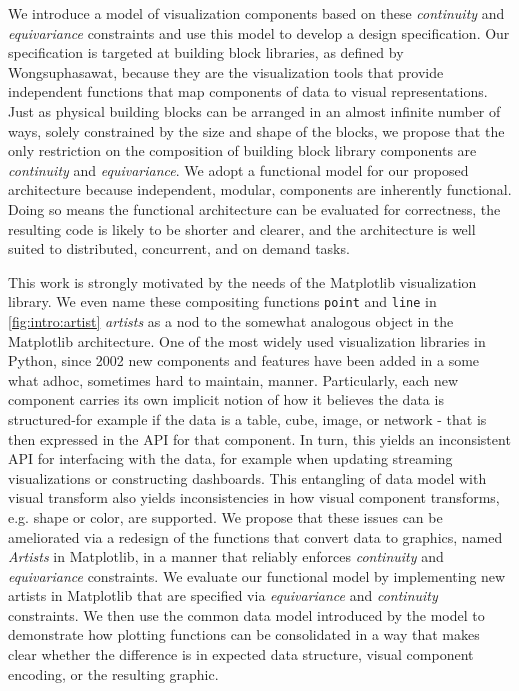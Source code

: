 \documentclass[../main.tex]{subfiles}
\begin{document}
We introduce a model of visualization components based on these \textit{continuity} and \textit{equivariance} constraints and use this model to develop a design specification. Our specification is targeted at building block libraries, as defined by Wongsuphasawat\cite{wongsuphasawatNavigatingWideWorld2021}, because they are the visualization tools that provide independent functions that map components of data to visual representations.  Just as physical building blocks can be arranged in an almost infinite number of ways, solely constrained by the size and shape of the blocks, we propose that the only restriction on the composition of building block library components are \textit{continuity} and \textit{equivariance}. We adopt a functional model for our proposed architecture because independent, modular, components are inherently functional\cite{hughesWhyFunctionalProgramming1989}. Doing so means the functional architecture can be evaluated for correctness, the resulting code is likely to be shorter and clearer, and the architecture is well suited to distributed, concurrent, and on demand tasks\cite{huHowFunctionalProgramming2015}.


This work is strongly motivated by the needs of the Matplotlib\cite{hunterMatplotlib2DGraphics2007,hunterArchitectureOpenSource} visualization library. We even name these compositing functions \texttt{point} and \texttt{line} in \autoref{fig:intro:artist} \textit{artists} as a nod to the somewhat analogous object in the Matplotlib architecture.  One of the most widely used visualization libraries in Python, since 2002 new components and features have been added in a some what adhoc, sometimes hard to maintain, manner. Particularly, each new component carries its own implicit notion of how it believes the data is structured-for example if the data is a table, cube, image, or network - that is then expressed in the API for that component. In turn, this yields an inconsistent API for interfacing with the data, for example when  updating streaming visualizations or constructing dashboards\cite{a.sarikayaWhatWeTalk2019}. This entangling of data model with visual transform also yields inconsistencies in how visual component transforms, e.g. shape or color, are supported. We propose that these issues can be ameliorated via a redesign of the functions that convert data to graphics, named \textit{Artists} in Matplotlib, in a manner that reliably enforces \textit{continuity} and \textit{equivariance} constraints. We evaluate our functional model by implementing new artists in Matplotlib that are specified via \textit{equivariance} and \textit{continuity} constraints. We then use the common data model introduced by the model to demonstrate how plotting functions can be consolidated in a way that makes clear whether the difference is in expected data structure, visual component encoding, or the resulting graphic. 
\end{document}

